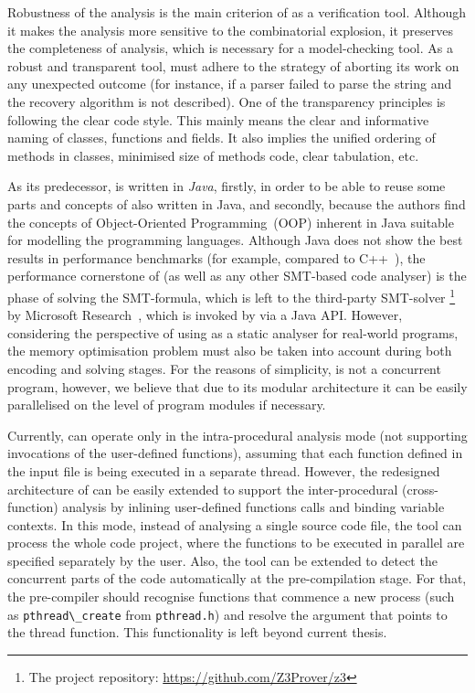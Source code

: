 Robustness of the analysis is the main criterion of \porthos[2] as a verification tool.
Although it makes the analysis more sensitive to the combinatorial explosion, it preserves the completeness of analysis, which is necessary for a model-checking tool.
As a robust and transparent tool, \porthos[2] must adhere to the strategy of aborting its work on any unexpected outcome (for instance, if a parser failed to parse the string and the recovery algorithm is not described).
One of the transparency principles is following the clear code style.
This mainly means the clear and informative naming of classes, functions and fields.
It also implies the unified ordering of methods in classes, minimised size of methods code, clear tabulation, etc.

As its predecessor, \porthos[2] is written in \textit{Java}, firstly, in order to be able to reuse some parts and concepts of \porthos{} also written in Java, and secondly, because the authors find the concepts of Object-Oriented Programming~(OOP) inherent in Java suitable for modelling the programming languages.
Although Java does not show the best results in performance benchmarks (for example, compared to C++~\cite{hundt2011loop}), the performance cornerstone of \porthos[2] (as well as any other SMT-based code analyser) is the phase of solving the SMT-formula, which is left to the third-party SMT-solver %
%
\footnote{The  project repository: \url{https://github.com/Z3Prover/z3}} %
by Microsoft Research~\cite{de2008z3}, which is invoked by \porthos[2] via a Java API.
%
However, considering the perspective of using \porthos[2] as a static analyser for real-world programs, the memory optimisation problem must also be taken into account during both encoding and solving stages.
For the reasons of simplicity, \porthos[2] is not a concurrent program, however, we believe that due to its modular architecture it can be easily parallelised on the level of program modules if necessary.

Currently, \porthos[2] can operate only in the intra-procedural analysis mode (not supporting invocations of the user-defined functions), assuming that each function defined in the input file is being executed in a separate thread.
However, the redesigned architecture of \porthos[2] can be easily extended to support the inter-procedural (cross-function) analysis by inlining user-defined functions calls and binding variable contexts.
In this mode, instead of analysing a single source code file, the tool can process the whole code project, where the functions to be executed in parallel are specified separately by the user.
Also, the tool can be extended to detect the concurrent parts of the code automatically at the pre-compilation stage.
For that, the pre-compiler should recognise functions that commence a new process (such as \lstinline{pthread\_create} from \texttt{pthread.h}) and resolve the argument that points to the thread function.
This functionality is left beyond current thesis.


